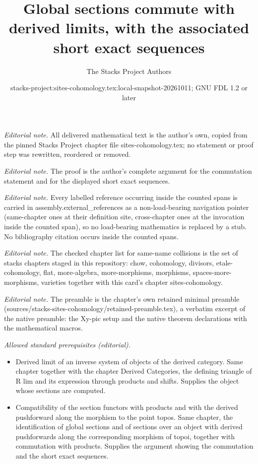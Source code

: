 \documentclass[10pt,a4paper]{amsart}
\title{Global sections commute with derived limits, with the associated short exact sequences}
\author{The Stacks Project Authors}
\date{stacks-project:sites-cohomology.tex:local-snapshot-20261011; GNU FDL 1.2 or later}
\theoremstyle{plain}
\theoremstyle{definition}
\theoremstyle{remark}
\numberwithin{equation}{subsection}
\begin{document}
\maketitle
\noindent\textit{Editorial note.} All delivered mathematical text is the author's own, copied from the pinned Stacks Project chapter file sites-cohomology.tex; no statement or proof step was rewritten, reordered or removed.\par\medskip
\noindent\textit{Editorial note.} The proof is the author's complete argument for the commutation statement and for the displayed short exact sequences.\par\medskip
\noindent\textit{Editorial note.} Every labelled reference occurring inside the counted spans is carried in assembly.external\_references as a non-load-bearing navigation pointer (same-chapter ones at their definition site, cross-chapter ones at the invocation inside the counted span), so no load-bearing mathematics is replaced by a stub. No bibliography citation occurs inside the counted spans.\par\medskip
\noindent\textit{Editorial note.} The checked chapter list for same-name collisions is the set of stacks chapters staged in this repository: chow, cohomology, divisors, etale-cohomology, flat, more-algebra, more-morphisms, morphisms, spaces-more-morphisms, varieties together with this card's chapter sites-cohomology.\par\medskip
\noindent\textit{Editorial note.} The preamble is the chapter's own retained minimal preamble (sources/stacks-sites-cohomology/retained-preamble.tex), a verbatim excerpt of the native preamble: the Xy-pic setup and the native theorem declarations with the mathematical macros.\par\medskip
\noindent\textit{Allowed standard prerequisites (editorial).}\begin{itemize}
\item Derived limit of an inverse system of objects of the derived category. Same chapter together with the chapter Derived Categories, the defining triangle of R lim and its expression through products and shifts. Supplies the object whose sections are computed.
\item Compatibility of the section functors with products and with the derived pushforward along the morphism to the point topos. Same chapter, the identification of global sections and of sections over an object with derived pushforwards along the corresponding morphism of topoi, together with commutation with products. Supplies the argument showing the commutation and the short exact sequences.
\end{itemize}\medskip
\end{document}
